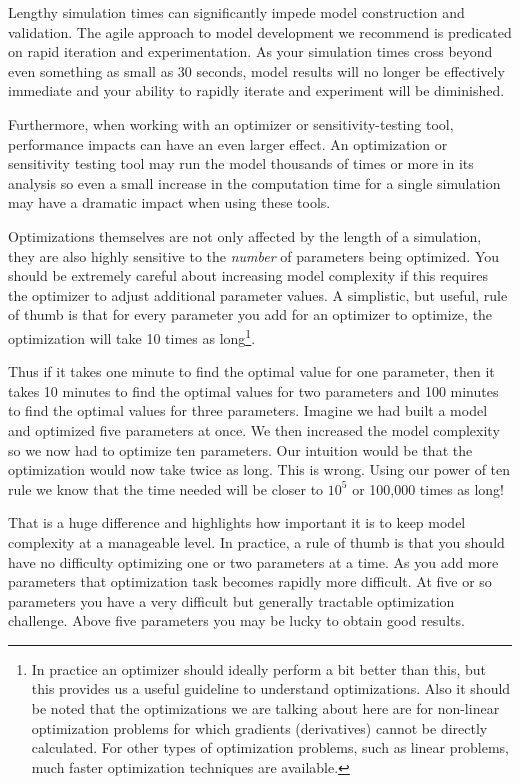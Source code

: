 \documentclass[]{memoir}
\begin{document}
Lengthy simulation times can significantly impede model construction and
validation. The agile approach to model development we recommend is
predicated on rapid iteration and experimentation. As your simulation
times cross beyond even something as small as 30 seconds, model results
will no longer be effectively immediate and your ability to rapidly
iterate and experiment will be diminished.

Furthermore, when working with an optimizer or sensitivity-testing tool,
performance impacts can have an even larger effect. An optimization or
sensitivity testing tool may run the model thousands of times or more in
its analysis so even a small increase in the computation time for a
single simulation may have a dramatic impact when using these tools.

Optimizations themselves are not only affected by the length of a
simulation, they are also highly sensitive to the \emph{number} of
parameters being optimized. You should be extremely careful about
increasing model complexity if this requires the optimizer to adjust
additional parameter values. A simplistic, but useful, rule of thumb is
that for every parameter you add for an optimizer to optimize, the
optimization will take 10 times as long\footnote{In practice an
  optimizer should ideally perform a bit better than this, but this
  provides us a useful guideline to understand optimizations. Also it
  should be noted that the optimizations we are talking about here are
  for non-linear optimization problems for which gradients (derivatives)
  cannot be directly calculated. For other types of optimization
  problems, such as linear problems, much faster optimization techniques
  are available.}.

Thus if it takes one minute to find the optimal value for one parameter,
then it takes 10 minutes to find the optimal values for two parameters
and 100 minutes to find the optimal values for three parameters. Imagine
we had built a model and optimized five parameters at once. We then
increased the model complexity so we now had to optimize ten parameters.
Our intuition would be that the optimization would now take twice as
long. This is wrong. Using our power of ten rule we know that the time
needed will be closer to $10^5$ or 100,000 times as long!

That is a huge difference and highlights how important it is to keep
model complexity at a manageable level. In practice, a rule of thumb is
that you should have no difficulty optimizing one or two parameters at a
time. As you add more parameters that optimization task becomes rapidly
more difficult. At five or so parameters you have a very difficult but
generally tractable optimization challenge. Above five parameters you
may be lucky to obtain good results.
\end{document}

